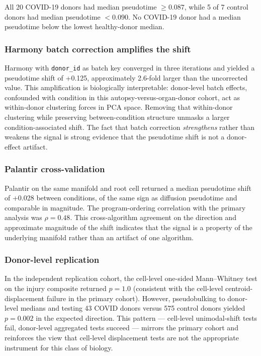 \documentclass[11pt,a4paper]{article}
\begin{document}
All 20 COVID-19 donors had median pseudotime $\geq 0.087$, while 5 of 7 control
donors had median pseudotime $< 0.090$. No COVID-19 donor had a median pseudotime
below the lowest healthy-donor median.

\subsubsection{Harmony batch correction amplifies the shift}

Harmony \citep{Korsunsky2019} with \texttt{donor\_id} as batch key converged in three
iterations and yielded a pseudotime shift of +0.125, approximately 2.6-fold
larger than the uncorrected value. This amplification is biologically
interpretable: donor-level batch effects, confounded with condition in this
autopsy-versus-organ-donor cohort, act as within-donor clustering forces in PCA
space. Removing that within-donor clustering while preserving between-condition
structure unmasks a larger condition-associated shift. The fact that batch
correction \textit{strengthens} rather than weakens the signal is strong evidence that
the pseudotime shift is not a donor-effect artifact.

\subsubsection{Palantir cross-validation}

Palantir \citep{Setty2019} on the same manifold and root cell returned a median
pseudotime shift of +0.028 between conditions, of the same sign as diffusion
pseudotime and comparable in magnitude. The program-ordering correlation with the
primary analysis was $\rho = 0.48$. This cross-algorithm agreement on the
direction and approximate magnitude of the shift indicates that the signal is a
property of the underlying manifold rather than an artifact of one algorithm.

\subsubsection{Donor-level replication}

In the independent replication cohort, the cell-level one-sided Mann--Whitney test
on the injury composite returned $p = 1.0$ (consistent with the cell-level
centroid-displacement failure in the primary cohort). However, pseudobulking to
donor-level medians and testing 43 COVID donors versus 575 control donors yielded
$p = 0.002$ in the expected direction. This pattern --- cell-level unimodal-shift
tests fail, donor-level aggregated tests succeed --- mirrors the primary cohort
and reinforces the view that cell-level displacement tests are not the appropriate
instrument for this class of biology.
\end{document}
